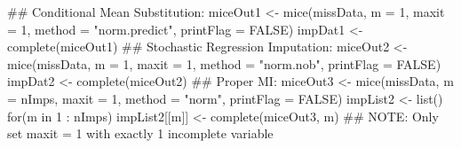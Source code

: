 \begin{Schunk}
\begin{Sinput}
 ## Conditional Mean Substitution:
 miceOut1 <- mice(missData,
                  m = 1,
                  maxit = 1,
                  method = "norm.predict",
                  printFlag = FALSE)
 impDat1 <- complete(miceOut1)
 ## Stochastic Regression Imputation:
 miceOut2 <- mice(missData,
                  m = 1,
                  maxit = 1, 
                  method = "norm.nob",
                  printFlag = FALSE)
 impDat2 <- complete(miceOut2)
 ## Proper MI:
 miceOut3 <- mice(missData,
                  m = nImps,
                  maxit = 1,
                  method = "norm",
                  printFlag = FALSE)
 impList2 <- list()
 for(m in 1 : nImps) impList2[[m]] <- complete(miceOut3, m)
 ## NOTE: Only set maxit = 1 with exactly 1 incomplete variable
\end{Sinput}
\end{Schunk}
